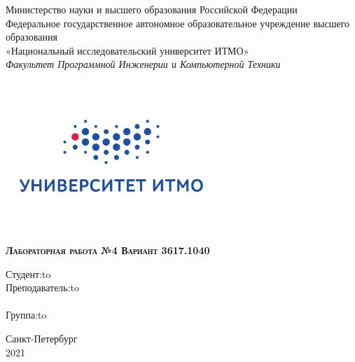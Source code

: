 \Large
\thispagestyle{empty}
\begin{center}
Министерство науки и высшего образования Российской Федерации \\
Федеральное государственное автономное образовательное учреждение высшего образования \\
«Национальный исследовательский университет ИТМО» \\
\vspace{1em}
\textsl{Факультет Программной Инженерии и Компьютерной Техники}\\
\end{center}

\vspace{1em}

\thispagestyle{empty}
\begin{center}
\includegraphics[width=8cm]{imgs/itmo.jpg}
\end{center}

\vspace{3em}

\begin{center}
\large{
\textsc{\textbf{
Лабораторная работа №4 \linebreak 
Вариант 3617.1040}}
}
\end{center}

\vspace{12em}



\newbox{\lbox}
\savebox{\lbox}{\hbox{\studName}}
\newlength{\maxl}
\setlength{\maxl}{\wd\lbox}
\hfill\parbox{11cm}{
\hspace*{5cm}\hspace*{-5cm}Студент:\hfill\hbox to\maxl{\studName\hfill}\\
\hspace*{5cm}\hspace*{-5cm}Преподаватель:\hfill\hbox to\maxl{\teacherName}\\
\\
\hspace*{5cm}\hspace*{-5cm}Группа:\hfill\hbox to\maxl{\groupNumber}\\
}

\vspace{\fill}

\begin{center}
Санкт-Петербург \\2021
\end{center}
\newpage